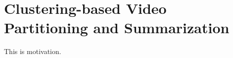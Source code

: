 \section{Clustering-based Video Partitioning and Summarization}
\label{section:method-model}

This is motivation.